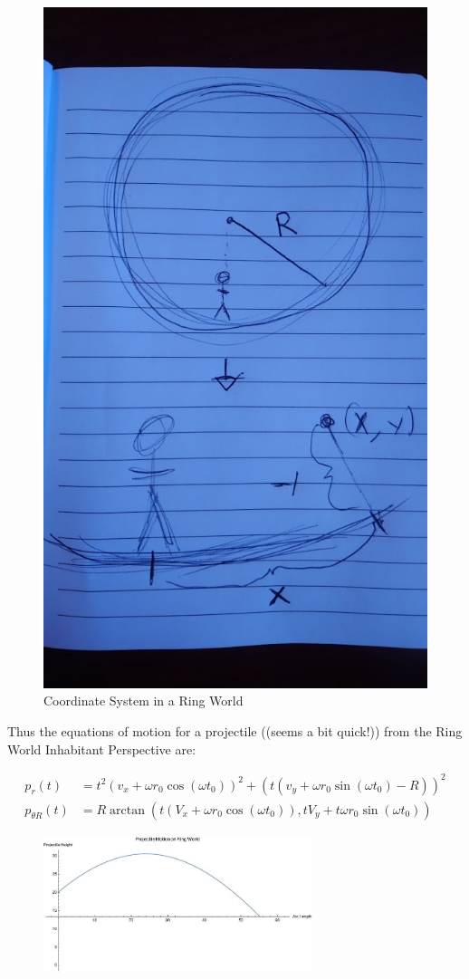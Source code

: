 \documentclass{amsart}
\theoremstyle{definition}
\begin{document}
\begin{figure}
	\centering
	\includegraphics[width=0.7\linewidth]{figures/coord_syst_intro_rough.JPG}
	\caption{Coordinate System in a Ring World}
	\label{fig:coord_ring}
\end{figure}



Thus the equations of motion for a projectile ((seems a bit quick!))
from the Ring World Inhabitant Perspective are:

\begin{align*}
  p_{r}(t) &= t^2 (v_x + \omega r_0 \cos(\omega t_0))^2 + (t(v_y + \omega
  r_0 \sin(\omega t_0) - R))^2\\
  p_{\theta R}(t) &=R \arctan(t(V_x + \omega r_0 \cos(\omega t_0)),tV_y +
                    t \omega r_0 \sin(\omega t_0))
\end{align*}

\begin{figure}[h]
  \centering
  \includegraphics[width=0.7\textwidth]{ArclengthProjectileLabeled.jpg}
  \label{fig:shipview}
  \caption{}
\end{figure}
\end{document}
